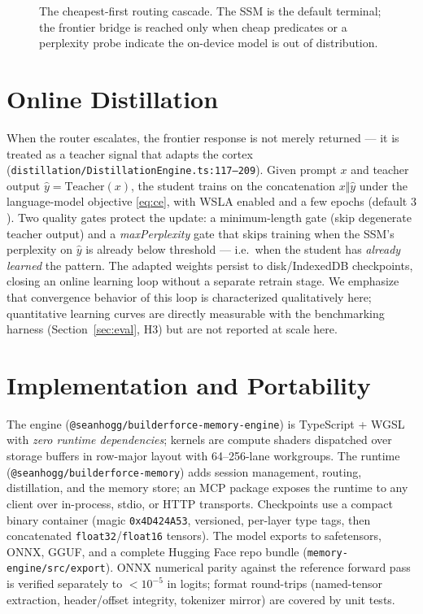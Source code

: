 \documentclass[journal,onecolumn,11pt]{IEEEtran}
\begin{document}
\begin{figure}[t]
\centering

\caption{The cheapest-first routing cascade. The SSM is the default terminal;
the frontier bridge is reached only when cheap predicates or a perplexity probe
indicate the on-device model is out of distribution.}
\label{fig:router}
\end{figure}

\section{Online Distillation}
\label{sec:distill}
When the router escalates, the frontier response is not merely returned --- it is
treated as a teacher signal that adapts the cortex
(\texttt{distillation/DistillationEngine.ts:117--209}). Given prompt $x$ and
teacher output $\hat y=\mathrm{Teacher}(x)$, the student trains on the
concatenation $x\Vert\hat y$ under the language-model objective \eqref{eq:ce},
with WSLA enabled and a few epochs (default $3$). Two quality gates protect the
update: a minimum-length gate (skip degenerate teacher output) and a
\emph{maxPerplexity} gate that skips training when the SSM's perplexity on
$\hat y$ is already below threshold --- i.e.\ when the student has \emph{already
learned} the pattern. The adapted weights persist to disk/IndexedDB checkpoints,
closing an online learning loop without a separate retrain stage. We emphasize
that convergence behavior of this loop is characterized qualitatively here;
quantitative learning curves are directly measurable with the benchmarking
harness (Section~\ref{sec:eval}, H3) but are not reported at scale here.

\section{Implementation and Portability}
\label{sec:impl}
The engine (\texttt{@seanhogg/builderforce-memory-engine}) is TypeScript + WGSL
with \emph{zero runtime dependencies}; kernels are compute shaders dispatched
over storage buffers in row-major layout with 64--256-lane workgroups. The
runtime (\texttt{@seanhogg/builderforce-memory}) adds session management,
routing, distillation, and the memory store; an MCP package exposes the runtime
to any client over in-process, stdio, or HTTP transports. Checkpoints use a
compact binary container (magic \texttt{0x4D424A53}, versioned, per-layer type
tags, then concatenated \texttt{float32}/\texttt{float16} tensors). The model
exports to safetensors, ONNX, GGUF, and a complete Hugging Face repo bundle
(\texttt{memory-engine/src/export}). ONNX numerical parity against the reference
forward pass is verified separately to $<\!10^{-5}$ in logits; format round-trips
(named-tensor extraction, header/offset integrity, tokenizer mirror) are covered
by unit tests.
\end{document}
